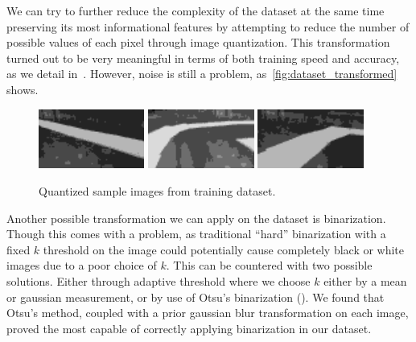 We can try to further reduce the complexity of the dataset at the same time preserving its most
informational features by attempting to reduce the number of possible values of each pixel through
image quantization. This transformation turned out to be very meaningful in terms of both training
speed and accuracy, as we detail in~. However, noise is still a problem,
as~\autoref{fig:dataset_transformed} shows.

\begin{figure}[h]
  \centering\includegraphics[width=0.31\textwidth]{imgs/trans_left.png}
  \includegraphics[width=0.31\textwidth]{imgs/trans_up.png}
  \includegraphics[width=0.31\textwidth]{imgs/trans_right.png}
  \caption{Quantized sample images from training dataset.\label{fig:dataset_transformed}}
\end{figure}

Another possible transformation we can apply on the dataset is binarization. Though this comes with
a problem, as traditional ``hard'' binarization with a fixed $k$ threshold on the image could
potentially cause completely black or white images due to a poor choice of $k$. This can be
countered with two possible solutions.  Either through adaptive threshold where we choose $k$
either by a mean or gaussian measurement, or by use of Otsu's binarization (\cite{otsu}).  We found
that Otsu's method, coupled with a prior gaussian blur transformation on each image, proved the
most capable of correctly applying binarization in our dataset.

